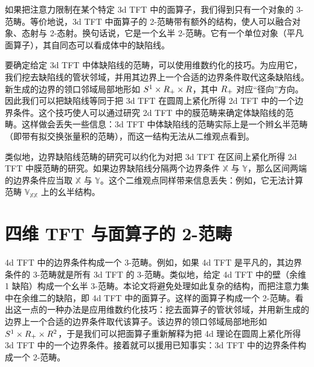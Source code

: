 
如果把注意力限制在某个特定 3d TFT 中的面算子，我们得到只有一个对象的 3-范畴。等价地说，3d TFT 中面算子的 2-范畴带有额外的结构，使人可以融合对象、态射与 2-态射。换句话说，它是一个幺半 2-范畴。它有一个单位对象（平凡面算子），其自同态可以看成体中的缺陷线。

要确定给定 3d TFT 中体缺陷线的范畴，可以使用维数约化的技巧。为应用它，我们挖去缺陷线的管状邻域，并用其边界上一个合适的边界条件取代这条缺陷线。新生成的边界的领口邻域局部地形如 $S^1\times R_+\times R$，其中 $R_+$ 对应“径向”方向。因此我们可以把缺陷线等同于把 3d TFT 在圆周上紧化所得 2d TFT 中的一个边界条件。这个技巧使人可以通过研究 2d TFT 中的膜范畴来确定体缺陷线的范畴。这样做会丢失一些信息：3d TFT 中体缺陷线的范畴实际上是一个辫幺半范畴（即带有拟交换张量积的范畴），而这一结构无法从二维观点看到。


类似地，边界缺陷线范畴的研究可以约化为对把 3d TFT 在区间上紧化所得 2d TFT 中膜范畴的研究。如果边界缺陷线分隔两个边界条件 $\mathbb{X}$ 与 $\mathbb{Y}$，那么区间两端的边界条件应当取 $\mathbb{X}$ 与 $\mathbb{Y}$。这个二维观点同样带来信息丢失：例如，它无法计算范畴 $\mathbb{V}_{\mathbb{X}\mathbb{X}}$ 上的幺半结构。

\section{四维 TFT 与面算子的 2-范畴}

4d TFT 中的边界条件构成一个 3-范畴。例如，如果 4d TFT 是平凡的，其边界条件的 3-范畴就是所有 3d TFT 的 3-范畴。类似地，给定 4d TFT 中的壁（余维 1 缺陷）构成一个幺半 3-范畴。本论文将避免处理如此复杂的结构，而把注意力集中在余维二的缺陷，即 4d TFT 中的面算子。这样的面算子构成一个 2-范畴。看出这一点的一种办法是应用维数约化技巧：挖去面算子的管状邻域，并用新生成的边界上一个合适的边界条件取代该算子。该边界的领口邻域局部地形如 $S^1\times R_+\times R^2$，于是我们可以把面算子重新解释为把 4d 理论在圆周上紧化所得 3d TFT 中的一个边界条件。接着就可以援用已知事实：3d TFT 中的边界条件构成一个 2-范畴。

